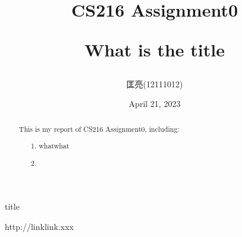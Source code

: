 \documentclass{article}
\title{CS216 Assignment0 \\ {\begin{large} What is the title \end{large}}}  %
\author{匡亮(12111012)}
\date{April 21, 2023}  %
\begin{document}
\maketitle

\renewcommand\abstractname{Abstract}
\begin{abstract}

This is my report of CS216 Assignment0, including:

\begin{itemize}
    \item[1.] whatwhat
    \item[2.] 
\end{itemize}

\end{abstract}

\newpage %

\renewcommand\contentsname{Contents}
\tableofcontents

\newpage  %



\newpage  %

\renewcommand\refname{References}  %
\begin{thebibliography}{99}
     title

    http://linklink.xxx
\end{thebibliography}
\end{document}
